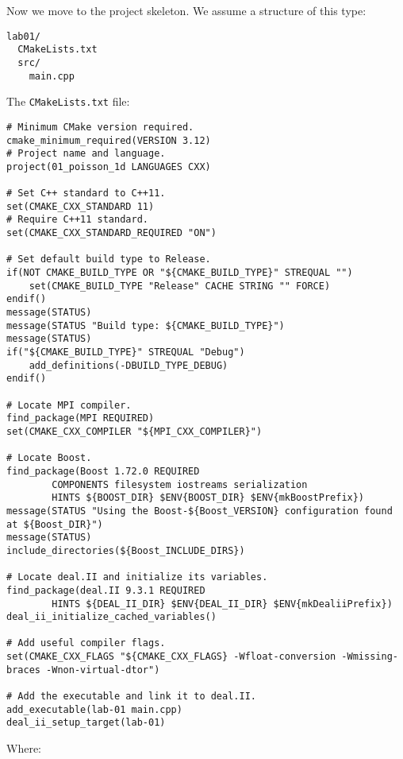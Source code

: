 \highspace
Now we move to the project skeleton. We assume a structure of this type:
\begin{lstlisting}
lab01/
  CMakeLists.txt
  src/
    main.cpp\end{lstlisting}
The \texttt{CMakeLists.txt} file:
\begin{lstlisting}[mathescape=false]
# Minimum CMake version required.
cmake_minimum_required(VERSION 3.12)
# Project name and language.
project(01_poisson_1d LANGUAGES CXX)

# Set C++ standard to C++11.
set(CMAKE_CXX_STANDARD 11)
# Require C++11 standard.
set(CMAKE_CXX_STANDARD_REQUIRED "ON")

# Set default build type to Release.
if(NOT CMAKE_BUILD_TYPE OR "${CMAKE_BUILD_TYPE}" STREQUAL "")
    set(CMAKE_BUILD_TYPE "Release" CACHE STRING "" FORCE)
endif()
message(STATUS)
message(STATUS "Build type: ${CMAKE_BUILD_TYPE}")
message(STATUS)
if("${CMAKE_BUILD_TYPE}" STREQUAL "Debug")
    add_definitions(-DBUILD_TYPE_DEBUG)
endif()

# Locate MPI compiler.
find_package(MPI REQUIRED)
set(CMAKE_CXX_COMPILER "${MPI_CXX_COMPILER}")

# Locate Boost.
find_package(Boost 1.72.0 REQUIRED
        COMPONENTS filesystem iostreams serialization
        HINTS ${BOOST_DIR} $ENV{BOOST_DIR} $ENV{mkBoostPrefix})
message(STATUS "Using the Boost-${Boost_VERSION} configuration found at ${Boost_DIR}")
message(STATUS)
include_directories(${Boost_INCLUDE_DIRS})

# Locate deal.II and initialize its variables.
find_package(deal.II 9.3.1 REQUIRED
        HINTS ${DEAL_II_DIR} $ENV{DEAL_II_DIR} $ENV{mkDealiiPrefix})
deal_ii_initialize_cached_variables()

# Add useful compiler flags.
set(CMAKE_CXX_FLAGS "${CMAKE_CXX_FLAGS} -Wfloat-conversion -Wmissing-braces -Wnon-virtual-dtor")

# Add the executable and link it to deal.II.
add_executable(lab-01 main.cpp)
deal_ii_setup_target(lab-01)
\end{lstlisting}
Where:
